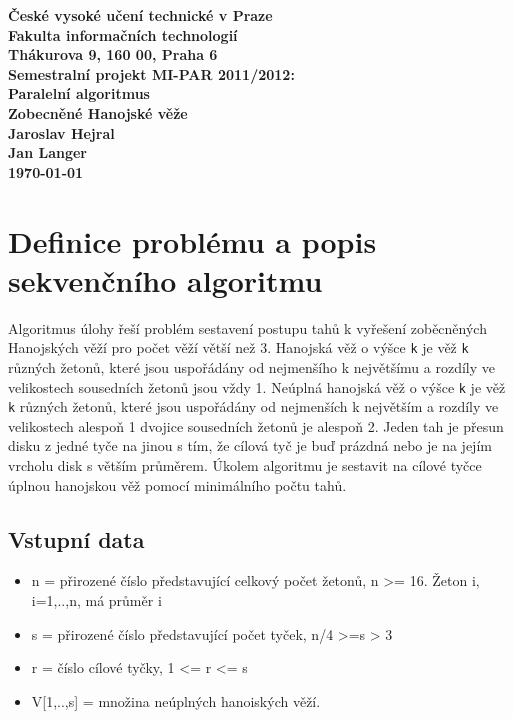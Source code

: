 \documentclass[12pt]{article}
\begin{document}

\begin{center}
\bf České vysoké učení technické v Praze\\[2mm]
	Fakulta informačních technologií\\[2mm]
	Thákurova 9, 160 00, Praha 6\\[15mm]
	\textbf{Semestralní projekt MI-PAR 2011/2012:\\
    Paralelní algoritmus \\
    Zobecněné Hanojské věže}\\[5mm]
       Jaroslav Hejral\\
       Jan Langer\\[2mm]
\today\\[12mm]
\end{center}

\section{Definice problému a popis sekvenčního algoritmu}
Algoritmus úlohy řeší problém sestavení postupu tahů k vyřešení zoběcněných
Hanojských věží pro počet věží větší než 3. Hanojská věž o výšce \verb|k| je věž
\verb|k| různých žetonů, které jsou uspořádány od nejmenšího k největšímu a
rozdíly ve velikostech sousedních žetonů jsou vždy 1. Neúplná
hanojská věž o výšce \verb|k| je věž \verb|k| různých žetonů, které jsou
uspořádány od nejmenších k největším a rozdíly ve velikostech alespoň 1 dvojice
sousedních žetonů je alespoň 2. Jeden tah je přesun disku z jedné tyče na jinou
s tím, že cílová tyč je buď prázdná nebo je na jejím vrcholu disk s větším
průměrem. Úkolem algoritmu je sestavit na cílové tyčce úplnou hanojskou věž
pomocí minimálního počtu tahů.

\subsection{Vstupní data}
\begin{itemize}
\item n = přirozené číslo představující celkový počet žetonů, n >=
16. Žeton i, i=1,..,n, má průměr i
\item s = přirozené číslo představující počet tyček, n/4 >=s > 3
\item r = číslo cílové tyčky, 1 <= r <= s
\item V[1,..,s] = množina neúplných hanoiských věží.
\end{itemize}
\end{document}
